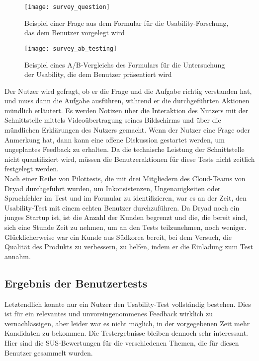 \begin{figure}[H]
  \centering
  \texttt{[image: survey\_question]}
  \caption{Beispiel einer Frage aus dem Formular für die Usability-Forschung, das dem Benutzer vorgelegt wird}
  \label{fig:survey_question}
\end{figure}

\begin{figure}[H]
  \centering
  \texttt{[image: survey\_ab\_testing]}
  \caption{Beispiel eines A/B-Vergleichs des Formulars für die Untersuchung der Usability, die dem Benutzer präsentiert wird}
  \label{fig:survey_ab_testing}
\end{figure}

Der Nutzer wird gefragt, ob er die Frage und die Aufgabe richtig verstanden hat, und muss dann die Aufgabe ausführen, während er die durchgeführten Aktionen mündlich erläutert.
Es werden Notizen über die Interaktion des Nutzers mit der Schnittstelle mittels Videoübertragung seines Bildschirms und über die mündlichen Erklärungen des Nutzers gemacht.
Wenn der Nutzer eine Frage oder Anmerkung hat, dann kann eine offene Diskussion gestartet werden, um ungeplantes Feedback zu erhalten.
Da die technische Leistung der Schnittstelle nicht quantifiziert wird, müssen die Benutzeraktionen für diese Tests nicht zeitlich festgelegt werden.\\

Nach einer Reihe von Pilottests, die mit drei Mitgliedern des Cloud-Teams von Dryad durchgeführt wurden, um Inkonsistenzen, Ungenauigkeiten oder Sprachfehler im Test und im Formular zu identifizieren, war es an der Zeit, den Usability-Test mit einem echten Benutzer durchzuführen.
Da Dryad noch ein junges Startup ist, ist die Anzahl der Kunden begrenzt und die, die bereit sind, sich eine Stunde Zeit zu nehmen, um an den Tests teilzunehmen, noch weniger.
Glücklicherweise war ein Kunde aus Südkorea bereit, bei dem Versuch, die Qualität des Produkts zu verbessern, zu helfen, indem er die Einladung zum Test annahm.

\subsection{Ergebnis der Benutzertests}

Letztendlich konnte nur ein Nutzer den Usability-Test vollständig bestehen.
Dies ist für ein relevantes und unvoreingenommenes Feedback wirklich zu vernachlässigen, aber leider war es nicht möglich, in der vorgegebenen Zeit mehr Kandidaten zu bekommen.
Die Testergebnisse bleiben dennoch sehr interessant.
Hier sind die \ac{SUS}-Bewertungen für die verschiedenen Themen, die für diesen Benutzer gesammelt wurden.

